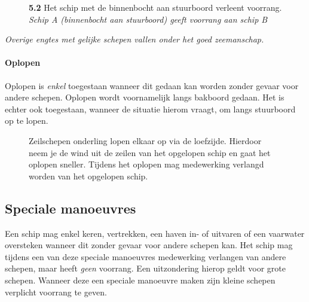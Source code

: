 \vspace{-0.7cm}

\begin{figure}[H]
	\centering
	\hspace{0.02\textwidth}
	\begin{minipage}[t]{0.70\textwidth}
		\textbf{5.2} Het schip met de binnenbocht aan stuurboord verleent voorrang.\\
		\textit{Schip A (binnenbocht aan stuurboord) geeft voorrang aan schip B}
	\end{minipage}
	\hfill
	\begin{minipage}[t]{0.25\textwidth}
		\label{pic:engte:10}
	\end{minipage}
	\hfill
\end{figure}
\vspace{-0.6cm}
\textit{Overige engtes met gelijke schepen vallen onder het goed zeemanschap.}

\paragraph{Oplopen}
Oplopen is \textit{enkel} toegestaan wanneer dit gedaan kan worden zonder gevaar voor andere schepen. Oplopen wordt voornamelijk langs bakboord gedaan. Het is echter ook toegestaan, wanneer de situatie hierom vraagt, om langs stuurboord op te lopen.



\begin{figure}[H]
	\centering
	\begin{minipage}[t]{0.70\textwidth}
	Zeilschepen onderling lopen elkaar op via de loefzijde. Hierdoor neem je de wind uit de zeilen van het opgelopen schip en gaat het oplopen sneller. Tijdens het oplopen mag medewerking verlangd worden van het opgelopen schip.
	\end{minipage}
	\hfill
	\begin{minipage}[t]{0.25\textwidth}
		\label{pic:op}
	\end{minipage}
	\hfill
\end{figure}

\subsection{Speciale manoeuvres}
Een schip mag enkel keren, vertrekken, een haven in- of uitvaren of een vaarwater oversteken wanneer dit zonder gevaar voor andere schepen kan. Het schip mag tijdens een van deze speciale manoeuvres medewerking verlangen van andere schepen, maar heeft \textit{geen} voorrang. Een uitzondering hierop geldt voor grote schepen. Wanneer deze een speciale manoeuvre maken zijn kleine schepen verplicht voorrang te geven.

